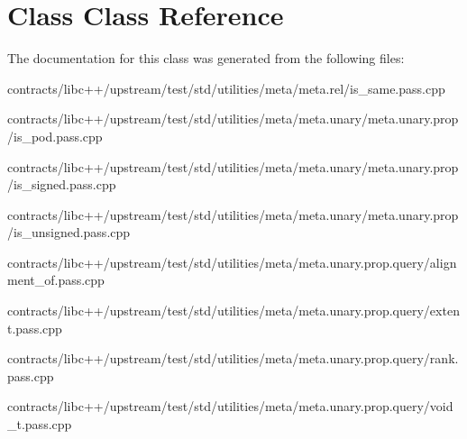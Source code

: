 \hypertarget{class_class}{}\section{Class Class Reference}
\label{class_class}


The documentation for this class was generated from the following files\+:\begin{DoxyCompactItemize}
\item 
contracts/libc++/upstream/test/std/utilities/meta/meta.\+rel/is\+\_\+same.\+pass.\+cpp\item 
contracts/libc++/upstream/test/std/utilities/meta/meta.\+unary/meta.\+unary.\+prop/is\+\_\+pod.\+pass.\+cpp\item 
contracts/libc++/upstream/test/std/utilities/meta/meta.\+unary/meta.\+unary.\+prop/is\+\_\+signed.\+pass.\+cpp\item 
contracts/libc++/upstream/test/std/utilities/meta/meta.\+unary/meta.\+unary.\+prop/is\+\_\+unsigned.\+pass.\+cpp\item 
contracts/libc++/upstream/test/std/utilities/meta/meta.\+unary.\+prop.\+query/alignment\+\_\+of.\+pass.\+cpp\item 
contracts/libc++/upstream/test/std/utilities/meta/meta.\+unary.\+prop.\+query/extent.\+pass.\+cpp\item 
contracts/libc++/upstream/test/std/utilities/meta/meta.\+unary.\+prop.\+query/rank.\+pass.\+cpp\item 
contracts/libc++/upstream/test/std/utilities/meta/meta.\+unary.\+prop.\+query/void\+\_\+t.\+pass.\+cpp\end{DoxyCompactItemize}
